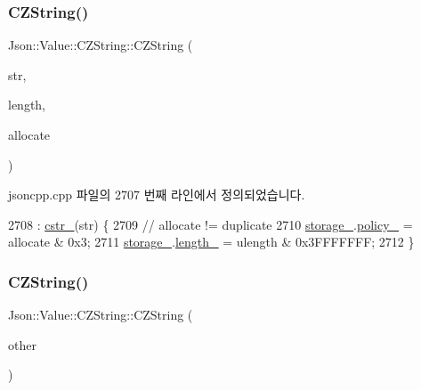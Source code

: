 \subsubsection{\texorpdfstring{C\+Z\+String()}{CZString()}\hspace{0.1cm}{\footnotesize\ttfamily [2/3]}}
{\footnotesize\ttfamily Json\+::\+Value\+::\+C\+Z\+String\+::\+C\+Z\+String (\begin{DoxyParamCaption}\item[{char const $\ast$}]{str,  }\item[{unsigned}]{length,  }\item[{\hyperlink{class_json_1_1_value_1_1_c_z_string_a2805c46fb4a72bbaed55de6d75941b6d}{Duplication\+Policy}}]{allocate }\end{DoxyParamCaption})}



jsoncpp.\+cpp 파일의 2707 번째 라인에서 정의되었습니다.


\begin{DoxyCode}
2708     : \hyperlink{class_json_1_1_value_1_1_c_z_string_a5b4d28349294034d7f779c3c95d0306c}{cstr\_}(str) \{
2709   \textcolor{comment}{// allocate != duplicate}
2710   \hyperlink{class_json_1_1_value_1_1_c_z_string_a17c92f0f089a4314e3b1d5695dc1a851}{storage\_}.\hyperlink{struct_json_1_1_value_1_1_c_z_string_1_1_string_storage_a7f68c8d6197c5692a525854b5f29f87b}{policy\_} = allocate & 0x3;
2711   \hyperlink{class_json_1_1_value_1_1_c_z_string_a17c92f0f089a4314e3b1d5695dc1a851}{storage\_}.\hyperlink{struct_json_1_1_value_1_1_c_z_string_1_1_string_storage_a165d865c44e6471d34668eeb4f15b140}{length\_} = ulength & 0x3FFFFFFF;
2712 \}
\end{DoxyCode}
\mbox{\label{class_json_1_1_value_1_1_c_z_string_a9685070d440335b55ef5c85747d25157}} 
\subsubsection{\texorpdfstring{C\+Z\+String()}{CZString()}\hspace{0.1cm}{\footnotesize\ttfamily [3/3]}}
{\footnotesize\ttfamily Json\+::\+Value\+::\+C\+Z\+String\+::\+C\+Z\+String (\begin{DoxyParamCaption}\item[{\hyperlink{class_json_1_1_value_1_1_c_z_string}{C\+Z\+String} const \&}]{other }\end{DoxyParamCaption})}



